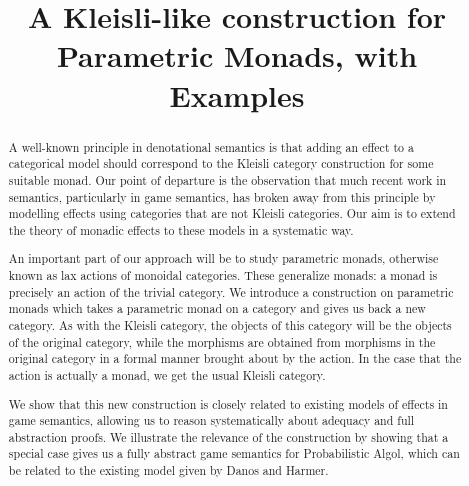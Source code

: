 \documentclass{svproc}
\newcommand{\0}{{\mathtt{0}}} \newcommand{\com}{{\mathtt{com}}}
\begin{document}
\mainmatter              %
%
\title{A Kleisli-like construction for Parametric Monads, with Examples}
%
%
\author{}
%
\authorrunning{} %
%
\tocauthor{}
%

\maketitle              %

\begin{abstract}
  A well-known principle in denotational semantics is that adding an effect to a categorical model should correspond to the Kleisli category construction for some suitable monad.  
  Our point of departure is the observation that much recent work in semantics, particularly in game semantics, has broken away from this principle by modelling effects using categories that are not Kleisli categories.  
  Our aim is to extend the theory of monadic effects to these models in a systematic way.

  An important part of our approach will be to study parametric monads, otherwise known as lax actions of monoidal categories.
  These generalize monads: a monad is precisely an action of the trivial category.
  We introduce a construction on parametric monads which takes a parametric monad on a category and gives us back a new category.  
  As with the Kleisli category, the objects of this category will be the objects of the original category, while the morphisms are obtained from morphisms in the original category in a formal manner brought about by the action.  
  In the case that the action is actually a monad, we get the usual Kleisli category.

  We show that this new construction is closely related to existing models of effects in game semantics, allowing us to reason systematically about adequacy and full abstraction proofs.
  We illustrate the relevance of the construction by showing that a special case gives us a fully abstract game semantics for Probabilistic Algol, which can be related to the existing model given by Danos and Harmer.
\end{abstract}
\end{document}
